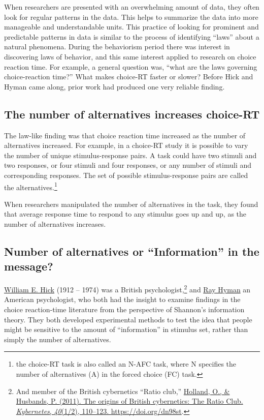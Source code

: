 \documentclass[
  oneside,
  12pt]{crumpbook}
\begin{document}
When researchers are presented with an overwhelming amount of data, they often look for regular patterns in the data. This helps to summarize the data into more manageable and understandable units. This practice of looking for prominent and predictable patterns in data is similar to the process of identifying ``laws'' about a natural phenomena. During the behaviorism period there was interest in discovering laws of behavior, and this same interest applied to research on choice reaction time. For example, a general question was, ``what are the laws governing choice-reaction time?'' What makes choice-RT faster or slower? Before Hick and Hyman came along, prior work had produced one very reliable finding.

\hypertarget{the-number-of-alternatives-increases-choice-rt}{%
\subsection{The number of alternatives increases choice-RT}\label{the-number-of-alternatives-increases-choice-rt}}

The law-like finding was that choice reaction time increased as the number of alternatives increased. For example, in a choice-RT study it is possible to vary the number of unique stimulus-response pairs. A task could have two stimuli and two responses, or four stimuli and four responses, or any number of stimuli and corresponding responses. The set of possible stimulus-response pairs are called the alternatives.\footnote{the choice-RT task is also called an N-AFC task, where N specifies the number of alternatives (A) in the forced choice (FC) task.}

When researchers manipulated the number of alternatives in the task, they found that average response time to respond to any stimulus goes up and up, as the number of alternatives increases.

\hypertarget{number-of-alternatives-or-information-in-the-message}{%
\subsection{Number of alternatives or ``Information'' in the message?}\label{number-of-alternatives-or-information-in-the-message}}

\href{https://en.wikipedia.org/wiki/W._E._Hick}{William E. Hick} (1912 -- 1974) was a British psychologist,\footnote{And member of the British cybernetics {``Ratio club,''} \protect\hyperlink{ref-hollandOriginsBritishCybernetics2011}{Holland, O., \& Husbands, P. (2011). The origins of {British} cybernetics: The {Ratio Club}. \emph{Kybernetes}, \emph{40}(1/2), 110--123. \url{https://doi.org/dn98st}}.} and \href{https://en.wikipedia.org/wiki/Ray_Hyman}{Ray Hyman} an American psychologist, who both had the insight to examine findings in the choice reaction-time literature from the perspective of Shannon's information theory. They both developed experimental methods to test the idea that people might be sensitive to the amount of ``information'' in stimulus set, rather than simply the number of alternatives.
\end{document}

